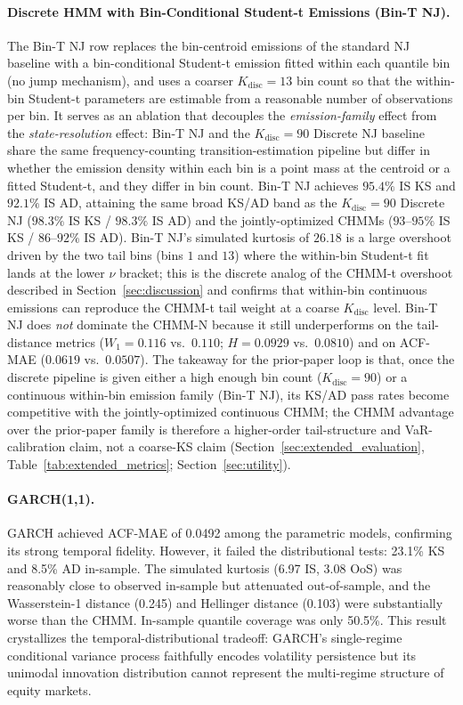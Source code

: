 \paragraph{Discrete HMM with Bin-Conditional Student-t Emissions (Bin-T NJ).}
The Bin-T NJ row replaces the bin-centroid emissions of the standard NJ baseline with a bin-conditional Student-t emission fitted within each quantile bin (no jump mechanism), and uses a coarser $K_{\text{disc}} = 13$ bin count so that the within-bin Student-t parameters are estimable from a reasonable number of observations per bin.
It serves as an ablation that decouples the \emph{emission-family} effect from the \emph{state-resolution} effect: Bin-T NJ and the $K_{\text{disc}} = 90$ Discrete NJ baseline share the same frequency-counting transition-estimation pipeline but differ in whether the emission density within each bin is a point mass at the centroid or a fitted Student-t, and they differ in bin count.
Bin-T NJ achieves $95.4\%$ IS KS and $92.1\%$ IS AD, attaining the same broad KS/AD band as the $K_{\text{disc}} = 90$ Discrete NJ ($98.3\%$ IS KS / $98.3\%$ IS AD) and the jointly-optimized CHMMs ($93$--$95\%$ IS KS / $86$--$92\%$ IS AD).
Bin-T NJ's simulated kurtosis of $26.18$ is a large overshoot driven by the two tail bins (bins $1$ and $13$) where the within-bin Student-t fit lands at the lower $\nu$ bracket; this is the discrete analog of the CHMM-t overshoot described in Section~\ref{sec:discussion} and confirms that within-bin continuous emissions can reproduce the CHMM-t tail weight at a coarse $K_{\text{disc}}$ level.
Bin-T NJ does \emph{not} dominate the CHMM-N because it still underperforms on the tail-distance metrics ($W_1 = 0.116$ vs.\ $0.110$; $H = 0.0929$ vs.\ $0.0810$) and on ACF-MAE ($0.0619$ vs.\ $0.0507$).
The takeaway for the prior-paper loop is that, once the discrete pipeline is given either a high enough bin count ($K_{\text{disc}} = 90$) or a continuous within-bin emission family (Bin-T NJ), its KS/AD pass rates become competitive with the jointly-optimized continuous CHMM; the CHMM advantage over the prior-paper family is therefore a higher-order tail-structure and VaR-calibration claim, not a coarse-KS claim (Section~\ref{sec:extended_evaluation}, Table~\ref{tab:extended_metrics}; Section~\ref{sec:utility}).

\paragraph{GARCH(1,1).}
GARCH achieved ACF-MAE of 0.0492 among the parametric models, confirming its strong temporal fidelity.
However, it failed the distributional tests: 23.1\% KS and 8.5\% AD in-sample.
The simulated kurtosis (6.97 IS, 3.08 OoS) was reasonably close to observed in-sample but attenuated out-of-sample, and the Wasserstein-1 distance (0.245) and Hellinger distance (0.103) were substantially worse than the CHMM.
In-sample quantile coverage was only 50.5\%.
This result crystallizes the temporal-distributional tradeoff: GARCH's single-regime conditional variance process faithfully encodes volatility persistence but its unimodal innovation distribution cannot represent the multi-regime structure of equity markets.

